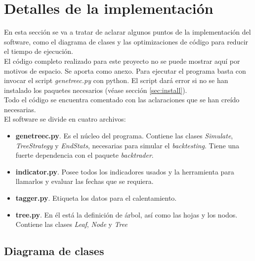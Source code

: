 \section{Detalles de la implementaci\'on}

En esta secci\'on se va a tratar de aclarar algunos puntos de la implementaci\'on del software, como el diagrama de clases y las optimizaciones de c\'odigo para reducir el tiempo de ejecuci\'on.\\

El c\'odigo completo realizado para este proyecto no se puede mostrar aqu\'i por motivos de espacio. Se aporta como anexo. Para ejecutar el programa basta con invocar el script \textit{genetreec.py} con python. El script dar\'a error si no se han instalado los paquetes necesarios (véase secci\'on \ref{sec:install}).\\

Todo el c\'odigo se encuentra comentado con las aclaraciones que se han cre\'ido necesarias.\\


El software se divide en cuatro archivos:\\

\begin{itemize}
    \item \textbf{genetreec.py}. Es el n\'ucleo del programa. Contiene las clases \textit{Simulate}, \textit{TreeStrategy} y \textit{EndStats}, necesarias para simular el \textit{backtesting}. Tiene una fuerte dependencia con el paquete \textit{backtrader}.
    
    \item \textbf{indicator.py}. Posee todos los indicadores usados y la herramienta para llamarlos y evaluar las fechas que se requiera.
    
    \item \textbf{tagger.py}. Etiqueta los datos para el calentamiento. 
    
    \item \textbf{tree.py}. En \'el est\'a la definici\'on de \'arbol, as\'i como las hojas y los nodos. Contiene las clases \textit{Leaf}, \textit{Node} y \textit{Tree}
\end{itemize}

\subsection{Diagrama de clases}

